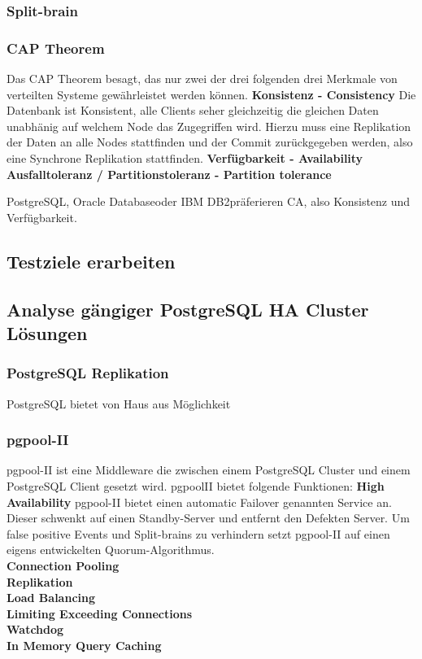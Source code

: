 \subsubsection{Split-brain}
\label{chap:Split-brain}
\subsubsection{CAP Theorem}
Das CAP Theorem besagt, das nur zwei der drei folgenden drei Merkmale von verteilten Systeme gewährleistet werden können\cite{EE6EQHU2}.
\textbf{Konsistenz - Consistency}
Die Datenbank ist Konsistent, alle Clients seher gleichzeitig die gleichen Daten unabhänig auf welchem Node das Zugegriffen wird.
Hierzu muss eine Replikation der Daten an alle Nodes stattfinden und der Commit zurückgegeben werden, also eine Synchrone Replikation stattfinden.
\textbf{Verfügbarkeit - Availability}
\textbf{Ausfalltoleranz / Partitionstoleranz - Partition tolerance}

\Gls{PostgreSQL}, \Gls{Oracle Database}oder \Gls{IBM DB2}präferieren CA, also Konsistenz und Verfügbarkeit.

\subsection{Testziele erarbeiten}
\subsection{Analyse gängiger PostgreSQL HA Cluster Lösungen}
\subsubsection{\Gls{PostgreSQL} Replikation}
PostgreSQL bietet von Haus aus Möglichkeit
\subsubsection{pgpool-II}
pgpool-II ist eine Middleware die zwischen einem \Gls{PostgreSQL Cluster} und einem PostgreSQL Client gesetzt wird.
pgpoolII bietet folgende Funktionen\cite{EXVNLICT,3XWCD3KX}:
\textbf{High Availability}
pgpool-II bietet einen automatic \Gls{Failover} genannten Service an.
Dieser schwenkt auf einen Standby-Server und entfernt den Defekten Server.
Um false positive Events und Split-brains zu verhindern setzt pgpool-II auf einen eigens entwickelten \Gls{Quorum}-Algorithmus.
\\\textbf{Connection Pooling}
\\\textbf{Replikation}
\\\textbf{Load Balancing}
\\\textbf{Limiting Exceeding Connections}
\\\textbf{Watchdog}
\\\textbf{In Memory Query Caching}

